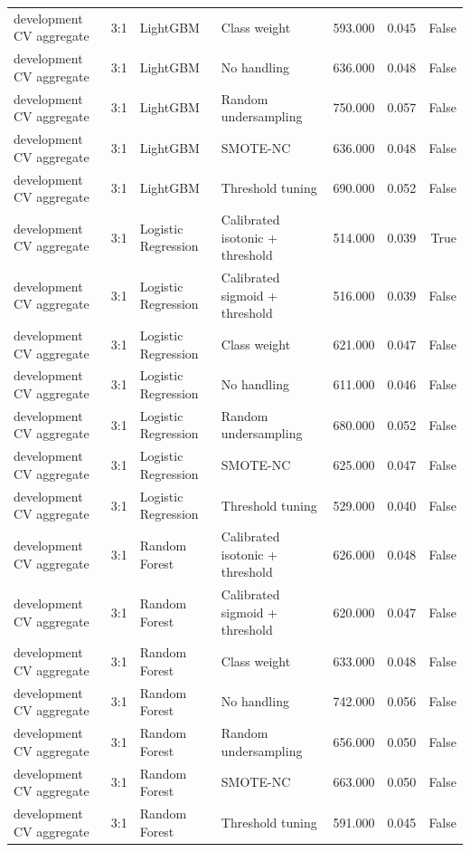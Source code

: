 \begin{tabular}{llllrrr}
development CV aggregate & 3:1 & LightGBM & Class weight & 593.000 & 0.045 & False \\
development CV aggregate & 3:1 & LightGBM & No handling & 636.000 & 0.048 & False \\
development CV aggregate & 3:1 & LightGBM & Random undersampling & 750.000 & 0.057 & False \\
development CV aggregate & 3:1 & LightGBM & SMOTE-NC & 636.000 & 0.048 & False \\
development CV aggregate & 3:1 & LightGBM & Threshold tuning & 690.000 & 0.052 & False \\
development CV aggregate & 3:1 & Logistic Regression & Calibrated isotonic + threshold & 514.000 & 0.039 & True \\
development CV aggregate & 3:1 & Logistic Regression & Calibrated sigmoid + threshold & 516.000 & 0.039 & False \\
development CV aggregate & 3:1 & Logistic Regression & Class weight & 621.000 & 0.047 & False \\
development CV aggregate & 3:1 & Logistic Regression & No handling & 611.000 & 0.046 & False \\
development CV aggregate & 3:1 & Logistic Regression & Random undersampling & 680.000 & 0.052 & False \\
development CV aggregate & 3:1 & Logistic Regression & SMOTE-NC & 625.000 & 0.047 & False \\
development CV aggregate & 3:1 & Logistic Regression & Threshold tuning & 529.000 & 0.040 & False \\
development CV aggregate & 3:1 & Random Forest & Calibrated isotonic + threshold & 626.000 & 0.048 & False \\
development CV aggregate & 3:1 & Random Forest & Calibrated sigmoid + threshold & 620.000 & 0.047 & False \\
development CV aggregate & 3:1 & Random Forest & Class weight & 633.000 & 0.048 & False \\
development CV aggregate & 3:1 & Random Forest & No handling & 742.000 & 0.056 & False \\
development CV aggregate & 3:1 & Random Forest & Random undersampling & 656.000 & 0.050 & False \\
development CV aggregate & 3:1 & Random Forest & SMOTE-NC & 663.000 & 0.050 & False \\
development CV aggregate & 3:1 & Random Forest & Threshold tuning & 591.000 & 0.045 & False \\

\end{tabular}
